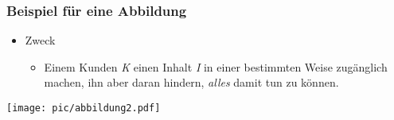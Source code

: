 \documentclass[t, xcolor=dvipsnames]{beamer}
\begin{document}
\begin{frame}
	\transwipe %
	\frametitle{Beispiel für eine Abbildung}
	\begin{itemize}
		\item Zweck
			\begin{itemize}
				\item Einem Kunden \emph{\color[RGB]{0,128,0} K} einen Inhalt \emph{\color{red} I} in einer bestimmten Weise zugänglich machen, ihn aber daran hindern, \emph{alles} damit tun zu können.
			\end{itemize}
	\end{itemize}
	\vspace{\fill}
	\begin{center}
		\texttt{[image: pic/abbildung2.pdf]}
	\end{center}
\end{frame}
\end{document}
